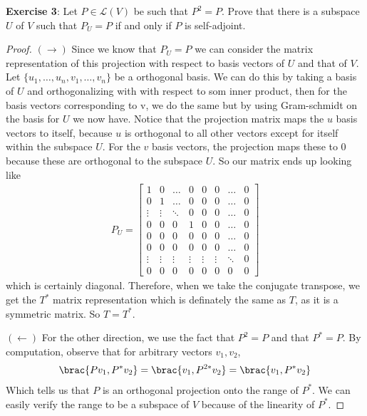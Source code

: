 \documentclass{article}
\begin{document}
\textbf{Exercise 3}: Let $P \in \mathcal{L}(V)$ be such that $P^{2} = P$. Prove that there is a subspace $U$ of $V$ such
that $P_{U} = P$ if and only if $P$ is self-adjoint. 

\begin{proof}
	$(\rightarrow)$ Since we know that $P_{U} = P$ we can consider the matrix representation of this projection with respect to basis vectors of $U$ and that of $V$. Let $\{u_{1}, \ldots, u_{n}, v_{1}, \ldots, v_{n}\}$ be a orthogonal basis. We can do this by taking a basis of $U$ and orthogonalizing with with respect to som inner product, then for the basis vectors corresponding to v, we do the same but by using Gram-schmidt on the basis for $U$ we now have. Notice that the projection matrix maps the $u$ basis vectors to itself, because $u$ is orthogonal to all other vectors except for itself within the subspace $U$. For the $v$ basis vectors, the projection maps these to 0 because these are orthogonal to the subspace $U$. So our matrix ends up looking like 
	\begin{align*}
		P_{U} = \begin{bmatrix}
			1 & 0 & \ldots & 0 & 0 & 0 & \ldots & 0 \\
			0 & 1 & \ldots & 0 & 0 & 0 & \ldots & 0 \\ 
			\vdots & \vdots & \ddots & 0 & 0 & 0 & \ldots & 0 \\ 
			0 & 0 & 0 & 1 & 0 & 0 & \ldots & 0 \\
			0 & 0 & 0 & 0 & 0 & 0 & \ldots & 0 \\
			0 & 0 & 0 & 0 & 0 & 0 & \ldots & 0 \\
			\vdots & \vdots & \vdots & \vdots & \vdots & \vdots & \ddots & 0 \\
			0 & 0 & 0 & 0 & 0 & 0 & 0 & 0 
		\end{bmatrix}
	\end{align*}
	which is certainly diagonal. Therefore, when we take the conjugate transpose, we get the $T^{*}$ matrix representation which is definately the same as $T$, as it is a symmetric matrix. So $T = T^{*}$. 

	$(\leftarrow)$ For the other direction, we use the fact that $P^{2} = P$ and that $P^{*} = P$. By computation, observe that for arbitrary vectors $v_{1}, v_{2}$,
	\begin{align*}
		\brac{Pv_{1}, P^{*}v_{2}} = \brac{v_{1}, P^{2*}v_{2}} = \brac{v_{1}, P^{*}v_{2}}
	\end{align*}
	Which tells us that $P$ is an orthogonal projection onto the range of $P^{*}$. We can easily verify the range to be a subspace of $V$ because of the linearity of $P^{*}$.
\end{proof}
\end{document}
